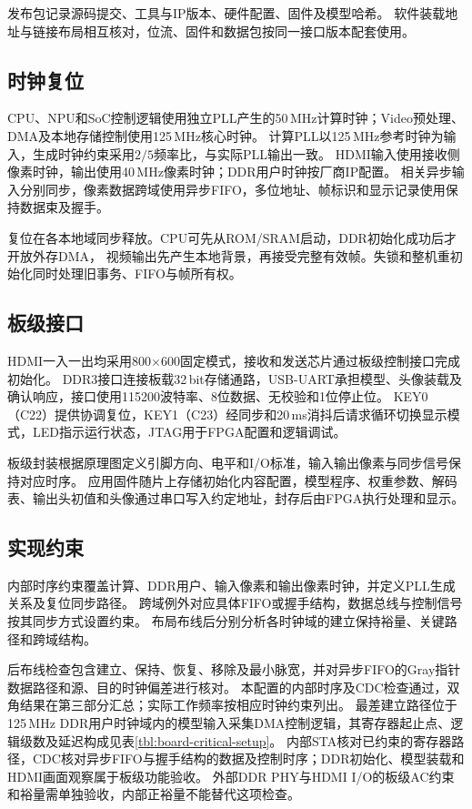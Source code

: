 发布包记录源码提交、工具与IP版本、硬件配置、固件及模型哈希。
软件装载地址与链接布局相互核对，位流、固件和数据包按同一接口版本配套使用。

\subsection{时钟复位}

CPU、NPU和SoC控制逻辑使用独立PLL产生的50\,MHz计算时钟；Video预处理、DMA及本地存储控制使用125\,MHz核心时钟。
计算PLL以125\,MHz参考时钟为输入，生成时钟约束采用$2/5$频率比，与实际PLL输出一致。
HDMI输入使用接收侧像素时钟，输出使用40\,MHz像素时钟；DDR用户时钟按厂商IP配置。
相关异步输入分别同步，像素数据跨域使用异步FIFO，多位地址、帧标识和显示记录使用保持数据束及握手\cite{cummings2008cdc}。

复位在各本地域同步释放。CPU可先从ROM/SRAM启动，DDR初始化成功后才开放外存DMA，
视频输出先产生本地背景，再接受完整有效帧。失锁和整机重初始化同时处理旧事务、FIFO与帧所有权。

\subsection{板级接口}

HDMI一入一出均采用800$\times$600固定模式，接收和发送芯片通过板级控制接口完成初始化。
DDR3接口连接板载32\,bit存储通路，USB-UART承担模型、头像装载及确认响应，接口使用115200波特率、8位数据、无校验和1位停止位。
KEY0（C22）提供协调复位，KEY1（C23）经同步和20\,ms消抖后请求循环切换显示模式，LED指示运行状态，JTAG用于FPGA配置和逻辑调试。

板级封装根据原理图定义引脚方向、电平和I/O标准，输入输出像素与同步信号保持对应时序。
应用固件随片上存储初始化内容配置，模型程序、权重参数、解码表、输出头初值和头像通过串口写入约定地址，封存后由FPGA执行处理和显示。

\subsection{实现约束}

内部时序约束覆盖计算、DDR用户、输入像素和输出像素时钟，并定义PLL生成关系及复位同步路径。
跨域例外对应具体FIFO或握手结构，数据总线与控制信号按其同步方式设置约束。
布局布线后分别分析各时钟域的建立保持裕量、关键路径和跨域结构。

后布线检查包含建立、保持、恢复、移除及最小脉宽，并对异步FIFO的Gray指针数据路径和源、目的时钟偏差进行核对。
本配置的内部时序及CDC检查通过，双角结果在第三部分汇总；实际工作频率按相应时钟约束列出。
最差建立路径位于125\,MHz DDR用户时钟域内的模型输入采集DMA控制逻辑，其寄存器起止点、逻辑级数及延迟构成见表\ref{tbl:board-critical-setup}。
内部STA核对已约束的寄存器路径，CDC核对异步FIFO与握手结构的数据及控制时序；DDR初始化、模型装载和HDMI画面观察属于板级功能验收。
外部DDR PHY与HDMI I/O的板级AC约束和裕量需单独验收，内部正裕量不能替代这项检查。
